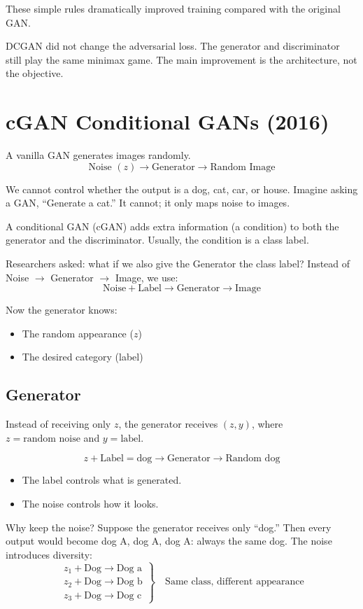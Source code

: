 These simple rules dramatically improved training compared with the original GAN.

DCGAN did not change the adversarial loss. The generator and discriminator still play the same minimax game. The main improvement is the architecture, not the objective.

\section{cGAN Conditional GANs (2016)}

A vanilla GAN generates images randomly.
\[
\text{Noise } (z) \longrightarrow \text{Generator} \longrightarrow \text{Random Image}
\]

We cannot control whether the output is a dog, cat, car, or house. Imagine asking a GAN, ``Generate a cat.'' It cannot; it only maps noise to images.

A conditional GAN (cGAN) adds extra information (a condition) to both the generator and the discriminator. Usually, the condition is a class label.

Researchers asked: what if we also give the Generator the class label?
Instead of Noise $\rightarrow$ Generator $\rightarrow$ Image, we use:
\[
\text{Noise} + \text{Label} \longrightarrow \text{Generator} \longrightarrow \text{Image}
\]

Now the generator knows:
\begin{itemize}
    \item The random appearance ($z$)
    \item The desired category (label)
\end{itemize}

\subsection*{Generator}

Instead of receiving only $z$, the generator receives $(z, y)$, where $z = \text{random noise}$ and $y = \text{label}$.

\[
z + \text{Label} = \text{dog} \longrightarrow \text{Generator} \longrightarrow \text{Random dog}
\]

\begin{itemize}
    \item The label controls what is generated.
    \item The noise controls how it looks.
\end{itemize}

Why keep the noise? Suppose the generator receives only ``dog.'' Then every output would become dog A, dog A, dog A: always the same dog.
The noise introduces diversity:
\[
\left.
\begin{array}{l}
z_1 + \text{Dog} \longrightarrow \text{Dog a} \\
z_2 + \text{Dog} \longrightarrow \text{Dog b} \\
z_3 + \text{Dog} \longrightarrow \text{Dog c}
\end{array}
\right\} \quad \text{Same class, different appearance}
\]

